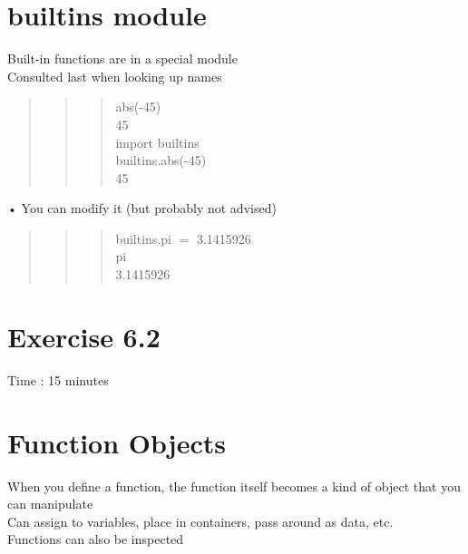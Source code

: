 \documentclass[
  letterpaper,
  DIV=11,
  numbers=noendperiod]{scrreprt}
\begin{document}

\chapter{builtins module}\label{builtins-module}

Built-in functions are in a special module\\
Consulted last when looking up names

\begin{quote}
\begin{quote}
\begin{quote}
abs(-45)\\
45\\
import builtins\\
builtins.abs(-45)\\
45
\end{quote}
\end{quote}
\end{quote}

• You can modify it (but probably not advised)

\begin{quote}
\begin{quote}
\begin{quote}
builtins.pi \(=\) 3.1415926\\
pi\\
3.1415926
\end{quote}
\end{quote}
\end{quote}


\chapter{Exercise 6.2}\label{exercise-6.2}

Time : 15 minutes


\chapter{Function Objects}\label{function-objects}

When you define a function, the function itself becomes a kind of object
that you can manipulate\\
Can assign to variables, place in containers, pass around as data,
etc.\\
Functions can also be inspected
\end{document}
